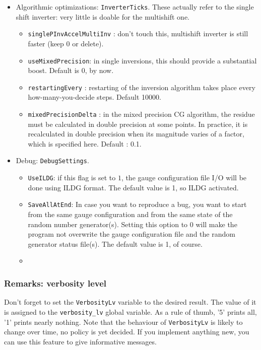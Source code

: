 \begin{itemize}
        
        
   \item{Algorithmic optimizations: \verb|InverterTicks|. }
   These actually refer to the single shift inverter: very little is doable for 
the multishift one.
   \begin{itemize}
    \item \verb|singlePInvAccelMultiInv| : don't touch this, multishift 
inverter is still faster (keep 0 or delete).
 \item \verb|useMixedPrecision|: in single inversions, this should provide a 
substantial boost. Default is 0, by now.
 \item \verb|restartingEvery| : restarting of the inversion algorithm takes 
place every how-many-you-decide steps. Default 10000.
 \item \verb|mixedPrecisionDelta| : in the mixed precision CG algorithm, the 
residue must be calculated in double precision at some points. In practice, it 
is recalculated in double precision when its magnitude varies of a factor, 
which is specified here. Default : 0.1.

   \end{itemize}

   
   
        
        
    \item{Debug: \verb|DebugSettings|.}
    \begin{itemize}
    \item \verb|UseILDG|: if this flag is set to $1$, the gauge configuration 
file  I/O will be done using ILDG format. The default value is 1, so ILDG 
activated.
    \item \verb|SaveAllAtEnd|: In case you want to reproduce a bug, you want to 
start from the same gauge configuration and from the same state of the random 
number generator(s). Setting this option to 0 will make the program not 
overwrite the gauge configuration file and the random generator status file(s). 
The default value is 1, of course.
    \item 
\end{itemize}
\end{itemize}


\subsubsection{Remarks: verbosity level}
Don't forget to set the \verb|VerbosityLv| variable to the desired result. 
The value of it is assigned to the \verb|verbosity_lv| global variable.
As a rule of thumb, '5' prints all, '1' prints nearly nothing. Note
that the behaviour of \verb|VerbosityLv| is likely to change over time, no
policy is yet decided. If you implement anything new, you can use this 
feature to give informative messages.

